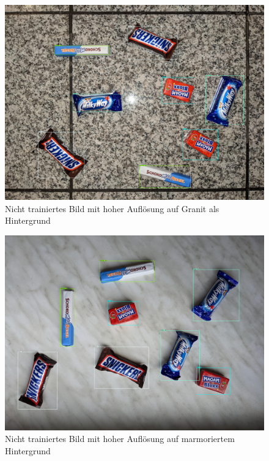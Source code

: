     \begin{figure}[H]
        \centering
        \includegraphics[angle = 90, width = \textwidth]{Bilder/models/model_comparison/faster_rcnn_inception_resnet_v2_640x640_coco17_tpu-8/HD_on_granite.jpg}
        \caption{Nicht trainiertes Bild mit hoher Auflösung auf Granit als Hintergrund}
    \end{figure}
    
    \begin{figure}[H]
        \centering
        \includegraphics[angle = 90, width = \textwidth]{Bilder/models/model_comparison/faster_rcnn_inception_resnet_v2_640x640_coco17_tpu-8/HD_on_marble.jpg}
        \caption{Nicht trainiertes Bild mit hoher Auflösung auf marmoriertem Hintergrund}
    \end{figure}
    
